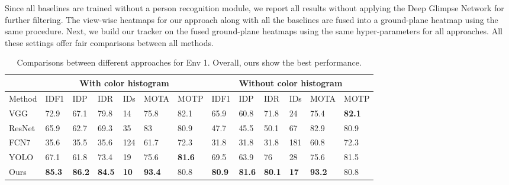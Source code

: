 \documentclass{article}
\begin{document}
Since all baselines are trained without a person recognition module, we report all results without applying the Deep Glimpse Network for further filtering.
The view-wise heatmaps for our approach along with all the baselines are fused into a ground-plane heatmap using the same procedure.
Next, we build our tracker on the fused ground-plane heatmaps using the same hyper-parameters for all approaches. All these settings offer fair comparisons between all
methods.
\begin{table}[!tbp]
	\begin{center}
		{
		\caption{Comparisons between different approaches for Env 1. Overall, ours show the best performance. }
		\label{tab:tracking:env1}
		\begin{tabular}{l|p{0.4cm}p{0.4cm}p{0.4cm}p{0.2cm}p{0.6cm}p{0.8cm}|p{0.4cm}p{0.4cm}p{0.4cm}p{0.2cm}p{0.6cm}p{0.8cm}}
			\hline
			& 	\multicolumn{6}{c}{With color histogram} & \multicolumn{6}{|c}{Without color histogram} \\ \hline
			Method &	IDF1 &IDP &IDR	&	IDs	&	MOTA	&	MOTP &	IDF1 &IDP &IDR	&	IDs	&	MOTA	&	MOTP \\ \hline
			VGG &	72.9&67.1&79.8	&	14	&	75.8	&	82.1 & 65.9&60.8&	71.8&	24	&	75.4	&	\textbf{82.1}	\\
			ResNet &65.9&62.7&	69.3	&	35	&	83	&	80.9& 47.7&45.5	& 50.1	&	67	&	82.9	&	80.9	\\
			FCN7 & 35.6	&35.5&35.6 & 124	&	61.7	&	72.3 & 31.8	&31.8& 31.8 &	181	&	60.8	&	72.3	\\
			YOLO &67.1&61.8	&73.4	&	19	&	75.6	&	\textbf{81.6} & 69.5	& 63.9&	76&	28	&	75.6	&	81.5	\\ \hline
			Ours &\textbf{85.3}	&\textbf{86.2}&	\textbf{84.5}&	\textbf{10}	&	\textbf{93.4}	&	80.8 &\textbf{80.9}&\textbf{81.6}	& \textbf{80.1}	&	\textbf{17}	&	\textbf{93.2}	&	80.8	\\ \hline
		\end{tabular}
	}
	\end{center}
\end{table}
\end{document}
